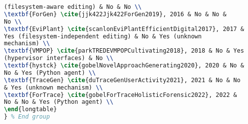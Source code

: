 \begin{lstlisting}[language=TeX]
(filesystem-aware editing) & No & No \\
\textbf{ForGen} \cite{jjk422Jjk422ForGen2019}, 2016 & No & No &
No \\
\textbf{EviPlant} \cite{scanlonEviPlantEfficientDigital2017}, 2017 &
Yes (filesystem-independent editing) & No & Yes (unknown
mechanism) \\
\textbf{VMPOP} \cite{parkTREDEVMPOPCultivating2018}, 2018 & No & Yes
(hypervisor interfaces) & No \\
\textbf{hystck} \cite{gobelNovelApproachGenerating2020}, 2020 & No &
No & Yes (Python agent) \\
\textbf{TraceGen} \cite{duTraceGenUserActivity2021}, 2021 & No & No
& Yes (unknown mechanism) \\
\textbf{ForTrace} \cite{gobelForTraceHolisticForensic2022}, 2022 &
No & No & Yes (Python agent) \\
\end{longtable}
} % End group
\end{lstlisting}
